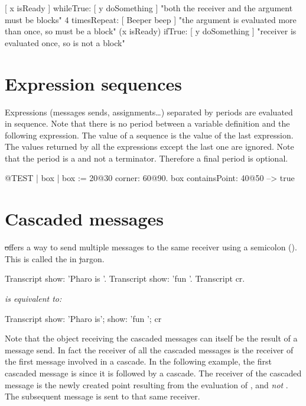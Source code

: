 \documentclass[a4paper,10pt,twoside]{book}
\begin{document}
\begin{code}{}
[ x isReady ] whileTrue: [ y doSomething ]   "both the receiver and the argument must be blocks"
4 timesRepeat: [ Beeper beep ]                   "the argument is evaluated more than once, so must be a block"
(x isReady) ifTrue: [ y doSomething ]           "receiver is evaluated once, so is not a block"
\end{code}

\section{Expression sequences}
Expressions (\ie messages sends, assignments\dots) separated by periods are evaluated in sequence.
Note that there is no period between a variable definition and the following expression.
The value of a sequence is the value of the last expression. The values returned by all the 
expressions except the last one are ignored. Note that the period is a  and not a terminator. Therefore a final period is optional.

\begin{code}{@TEST}
| box |
box := 20@30 corner: 60@90.
box containsPoint: 40@50 --> true
\end{code}

\section{Cascaded messages}
\st offers a way to send multiple messages to the same receiver using a semicolon (\ct{;}). This is called the  in \st jargon.


\begin{minipage}{0.35\textwidth}
\begin{code}{}
Transcript show: 'Pharo is '.
Transcript show: 'fun '.
Transcript cr.
\end{code}
\end{minipage}
\emph{is equivalent to:}
\begin{minipage}{0.35\textwidth}
\begin{code}{}
Transcript        
   show: 'Pharo is';
   show: 'fun ';
   cr
\end{code}
\end{minipage}

Note that the object receiving the cascaded messages can itself be the result of a message send. 
In fact the receiver of all the cascaded messages is the receiver of the first message involved in a cascade. In the following example, the first cascaded message is  since it is followed by a cascade. The receiver of the cascaded message  is the newly created point resulting from the evaluation of , and \emph{not} . The subsequent message  is sent to that same receiver. 
\end{document}
